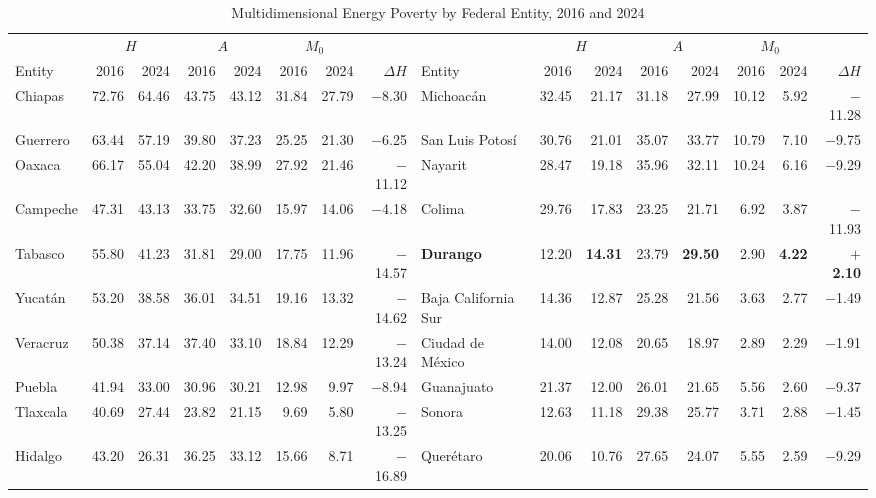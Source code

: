 \documentclass[11pt, a4paper]{article}
\begin{document}
\begin{table}
\centering
\caption{Multidimensional Energy Poverty by Federal Entity, 2016 and 2024}
\scriptsize
\begin{tabular}{l rr rr rr r @{\hskip 2em} l rr rr rr r}
\toprule
\toprule
 & \multicolumn{2}{c}{$H$} & \multicolumn{2}{c}{$A$} & \multicolumn{2}{c}{$M_0$} & & & \multicolumn{2}{c}{$H$} & \multicolumn{2}{c}{$A$} & \multicolumn{2}{c}{$M_0$} & \\
\cmidrule(lr){2-3} \cmidrule(lr){4-5} \cmidrule(lr){6-7} \cmidrule(lr){10-11} \cmidrule(lr){12-13} \cmidrule(lr){14-15}
Entity & 2016 & 2024 & 2016 & 2024 & 2016 & 2024 & $\Delta H$ & Entity & 2016 & 2024 & 2016 & 2024 & 2016 & 2024 & $\Delta H$ \\ \midrule
Chiapas         & 72.76 & 64.46 & 43.75 & 43.12 & 31.84 & 27.79 & $-$8.30  & Michoacán           & 32.45 & 21.17 & 31.18 & 27.99 & 10.12 & 5.92 & $-$11.28 \\
Guerrero        & 63.44 & 57.19 & 39.80 & 37.23 & 25.25 & 21.30 & $-$6.25  & San Luis Potosí     & 30.76 & 21.01 & 35.07 & 33.77 & 10.79 & 7.10 & $-$9.75 \\
Oaxaca          & 66.17 & 55.04 & 42.20 & 38.99 & 27.92 & 21.46 & $-$11.12 & Nayarit             & 28.47 & 19.18 & 35.96 & 32.11 & 10.24 & 6.16 & $-$9.29 \\
Campeche        & 47.31 & 43.13 & 33.75 & 32.60 & 15.97 & 14.06 & $-$4.18  & Colima              & 29.76 & 17.83 & 23.25 & 21.71 & 6.92 & 3.87 & $-$11.93 \\
Tabasco         & 55.80 & 41.23 & 31.81 & 29.00 & 17.75 & 11.96 & $-$14.57 & \textbf{Durango}    & 12.20 & \textbf{14.31} & 23.79 & \textbf{29.50} & 2.90 & \textbf{4.22} & \textbf{$+$2.10} \\
Yucatán         & 53.20 & 38.58 & 36.01 & 34.51 & 19.16 & 13.32 & $-$14.62 & Baja California Sur & 14.36 & 12.87 & 25.28 & 21.56 & 3.63 & 2.77 & $-$1.49 \\
Veracruz        & 50.38 & 37.14 & 37.40 & 33.10 & 18.84 & 12.29 & $-$13.24 & Ciudad de México    & 14.00 & 12.08 & 20.65 & 18.97 & 2.89 & 2.29 & $-$1.91 \\
Puebla          & 41.94 & 33.00 & 30.96 & 30.21 & 12.98 & 9.97  & $-$8.94  & Guanajuato          & 21.37 & 12.00 & 26.01 & 21.65 & 5.56 & 2.60 & $-$9.37 \\
Tlaxcala        & 40.69 & 27.44 & 23.82 & 21.15 & 9.69  & 5.80  & $-$13.25 & Sonora              & 12.63 & 11.18 & 29.38 & 25.77 & 3.71 & 2.88 & $-$1.45 \\
Hidalgo         & 43.20 & 26.31 & 36.25 & 33.12 & 15.66 & 8.71  & $-$16.89 & Querétaro           & 20.06 & 10.76 & 27.65 & 24.07 & 5.55 & 2.59 & $-$9.29 \\

\end{tabular}
\end{table}
\end{document}
